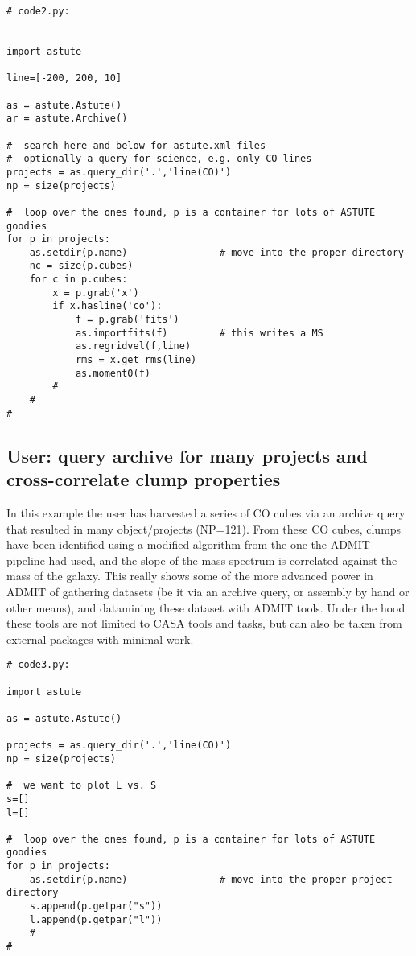 \documentclass[preprint]{aastex} %
\begin{document}
\footnotesize
\begin{verbatim}
# code2.py:


import astute

line=[-200, 200, 10]

as = astute.Astute()
ar = astute.Archive()

#  search here and below for astute.xml files
#  optionally a query for science, e.g. only CO lines
projects = as.query_dir('.','line(CO)')
np = size(projects)

#  loop over the ones found, p is a container for lots of ASTUTE goodies
for p in projects:
    as.setdir(p.name)                # move into the proper directory
    nc = size(p.cubes)
    for c in p.cubes:
        x = p.grab('x')
        if x.hasline('co'):
            f = p.grab('fits')
            as.importfits(f)         # this writes a MS
            as.regridvel(f,line)
            rms = x.get_rms(line)
            as.moment0(f)
        #
    #
#

\end{verbatim}
\normalsize


\subsection{User: query archive for many projects and cross-correlate clump properties}

In this example the user has harvested a series of CO cubes via
an archive query that resulted in many object/projects (NP=121).
From these CO cubes, clumps have been identified using a modified
algorithm from the one the ADMIT pipeline had used, and the slope
of the mass spectrum is correlated against the mass of the galaxy.
This really shows some of the more advanced power in ADMIT
of gathering datasets (be it via an archive query, or assembly by
hand or other means), and datamining these dataset with ADMIT tools.
Under the hood these tools are not limited to CASA tools and tasks, but
can also be taken from external packages with minimal work.

\footnotesize
\begin{verbatim}
# code3.py:

import astute

as = astute.Astute()

projects = as.query_dir('.','line(CO)')
np = size(projects)

#  we want to plot L vs. S
s=[]
l=[]

#  loop over the ones found, p is a container for lots of ASTUTE goodies
for p in projects:
    as.setdir(p.name)                # move into the proper project directory
    s.append(p.getpar("s"))
    l.append(p.getpar("l"))
    #
#


\end{verbatim}
\normalsize
\end{document}

